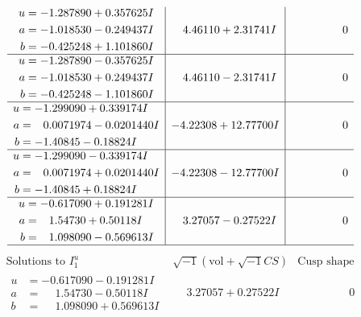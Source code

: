 \documentclass[1p]{elsarticle_modified}
\theoremstyle{definition}
\newcommand{\I}{\sqrt{-1}}
\begin{document}
$$\begin{array}{c|c|c}
\begin{aligned}
u &= -1.287890 + 0.357625 I \\
a &= -1.018530 - 0.249437 I \\
b &= -0.425248 + 1.101860 I\end{aligned}
 & \phantom{-}4.46110 + 2.31741 I & \phantom{-0.000000 } 0 \\ \hline\begin{aligned}
u &= -1.287890 - 0.357625 I \\
a &= -1.018530 + 0.249437 I \\
b &= -0.425248 - 1.101860 I\end{aligned}
 & \phantom{-}4.46110 - 2.31741 I & \phantom{-0.000000 } 0 \\ \hline\begin{aligned}
u &= -1.299090 + 0.339174 I \\
a &= \phantom{-}0.0071974 - 0.0201440 I \\
b &= -1.40845 - 0.18824 I\end{aligned}
 & -4.22308 + 12.77700 I & \phantom{-0.000000 } 0 \\ \hline\begin{aligned}
u &= -1.299090 - 0.339174 I \\
a &= \phantom{-}0.0071974 + 0.0201440 I \\
b &= -1.40845 + 0.18824 I\end{aligned}
 & -4.22308 - 12.77700 I & \phantom{-0.000000 } 0 \\ \hline\begin{aligned}
u &= -0.617090 + 0.191281 I \\
a &= \phantom{-}1.54730 + 0.50118 I \\
b &= \phantom{-}1.098090 - 0.569613 I\end{aligned}
 & \phantom{-}3.27057 - 0.27522 I & \phantom{-0.000000 } 0\\
 \hline 
 \end{array}$$\newpage$$\begin{array}{c|c|c}  
\text{Solutions to }I^u_{1}& \I (\text{vol} + \sqrt{-1}CS) & \text{Cusp shape}\\
 \hline 
\begin{aligned}
u &= -0.617090 - 0.191281 I \\
a &= \phantom{-}1.54730 - 0.50118 I \\
b &= \phantom{-}1.098090 + 0.569613 I\end{aligned}
 & \phantom{-}3.27057 + 0.27522 I & \phantom{-0.000000 } 0 \\ \hline\begin{aligned}

\end{aligned}
\end{array}$$
\end{document}
